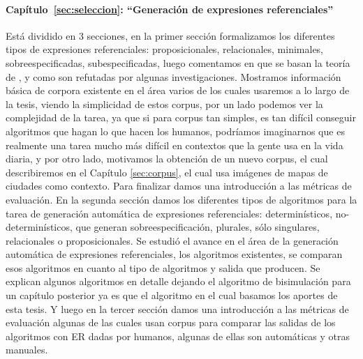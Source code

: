 \paragraph{Cap\'itulo~\ref{sec:seleccion}: ``Generaci\'on de expresiones referenciales''} Est\'a dividido en 3 secciones, en la primer secci\'on formalizamos los diferentes tipos de expresiones referenciales: proposicionales, relacionales, minimales, sobreespecificadas, subespecificadas, luego comentamos en que se basan la teor\'ia de \cite{clark1992arenas}, \cite{Clark-Marshall81} y como son refutadas por algunas investigaciones. Mostramos informaci\'on b\'asica de corpora existente en el \'area varios de los cuales usaremos a lo largo de la tesis, viendo la simplicidad de estos corpus, por un lado podemos ver la complejidad de la tarea, ya que si para corpus tan simples, es tan dif\'icil conseguir algoritmos que hagan lo que hacen los humanos, podr\'iamos imaginarnos que es realmente una tarea mucho m\'as dif\'icil en contextos que la gente usa en la vida diaria, y por otro lado, motivamos la obtenci\'on de un nuevo  corpus, el cual describiremos en el Cap\'itulo \ref{sec:corpus}, el cual usa im\'agenes de mapas de ciudades como contexto. Para finalizar damos una introducci\'on a las m\'etricas de evaluaci\'on. En la segunda secci\'on damos los diferentes tipos de algoritmos para la tarea de generaci\'on autom\'atica de expresiones referenciales: determin\'isticos, no-determin\'isticos, que generan sobreespecificaci\'on, plurales, s\'olo singulares, relacionales o proposicionales. Se estudi\'o el avance en el \'area de la generaci\'on autom\'atica de expresiones referenciales, los algoritmos existentes, se comparan esos algoritmos en cuanto al tipo de algoritmos y salida que producen. Se explican algunos algoritmos en detalle dejando el algoritmo de bisimulaci\'on para un cap\'itulo posterior ya es que el algoritmo en el cual basamos los aportes de esta tesis. Y luego en la tercer secci\'on damos una introducci\'on a las m\'etricas de evaluaci\'on algunas de las cuales usan corpus para comparar las salidas de los algoritmos con ER dadas por humanos, algunas de ellas son autom\'aticas y otras manuales. 



